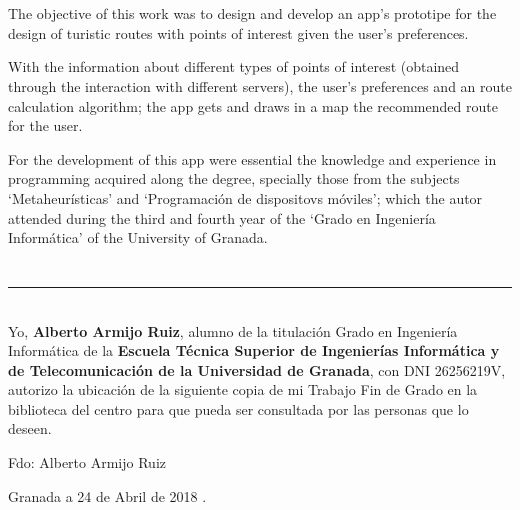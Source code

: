 \\

\vspace{0.7cm}
\\
The objective of this work was to design and develop an app's prototipe for the design of turistic routes with points of interest given the user's preferences.\newline

With the information about different types of points of interest (obtained through the interaction with different servers), the user's preferences and an route calculation algorithm; the app gets and draws in a map the recommended route for the user.\newline

For the development of this app were essential the knowledge and experience in programming acquired along the degree, specially those from the subjects \enquote*{Metaheurísticas} and \enquote*{Programación de dispositovs móviles}; which the autor attended during the third and fourth year of the \enquote*{Grado en Ingeniería Informática} of the University of Granada.

\chapter*{}
\thispagestyle{empty}

\noindent\rule[-1ex]{\textwidth}{2pt}\\[4.5ex]

Yo, \textbf{Alberto Armijo Ruiz}, alumno de la titulación Grado en Ingeniería Informática de la \textbf{Escuela Técnica Superior
de Ingenierías Informática y de Telecomunicación de la Universidad de Granada}, con DNI 26256219V, autorizo la
ubicación de la siguiente copia de mi Trabajo Fin de Grado en la biblioteca del centro para que pueda ser
consultada por las personas que lo deseen.

\vspace{6cm}

\noindent Fdo: Alberto Armijo Ruiz

\vspace{2cm}

\begin{flushright}
Granada a 24 de Abril de 2018 .
\end{flushright}



